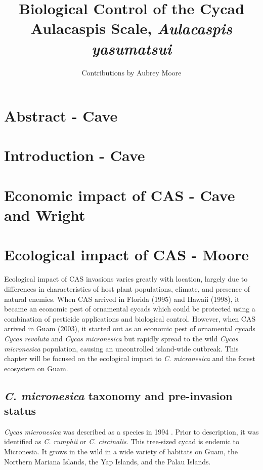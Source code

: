 \documentclass[12pt,letterpaper,english,bibliography=totocnumbered, abstract=on]{scrartcl}
\begin{document}
	
\listoftodos



\title{Biological Control of the Cycad Aulacaspis Scale, \textit{Aulacaspis yasumatsui}}

\author{Contributions by Aubrey Moore}

\maketitle
\newpage
\tableofcontents

\pagebreak

\section{Abstract - Cave}

\section{Introduction - Cave}

\section{Economic impact of CAS - Cave and Wright}

\section{Ecological impact of CAS - Moore}

Ecological impact of CAS invasions varies greatly with location, largely due to differences in characteristics of host plant populations, climate, and presence of natural enemies. When CAS arrived in Florida (1995) and Hawaii (1998), it became an economic pest of ornamental cycads which could be protected using a combination of pesticide applications and biological control. However, when CAS arrived in Guam (2003), it started out as an economic pest of ornamental cycads \textit{Cycas revoluta} and \textit{Cycas micronesica} but rapidly spread to the wild \textit{Cycas micronesica} population, causing an uncontrolled island-wide outbreak. This chapter will be focused on the ecological impact to \textit{C. micronesica} and the forest ecosystem on Guam.

\subsection{\textit{C. micronesica} taxonomy and pre-invasion status} \textit{Cycas micronesica} was described as a species in 1994 \parencite{hillCycasRumphiiComplex1994}.
Prior to description, it was identified as \textit{C. rumphii} or \textit{C. circinalis}. 
This tree-sized cycad is endemic to Micronesia. It grows in the wild in a wide variety of habitats on Guam, the Northern Mariana Islands, the Yap Islands, and the Palau Islands.
\end{document}
